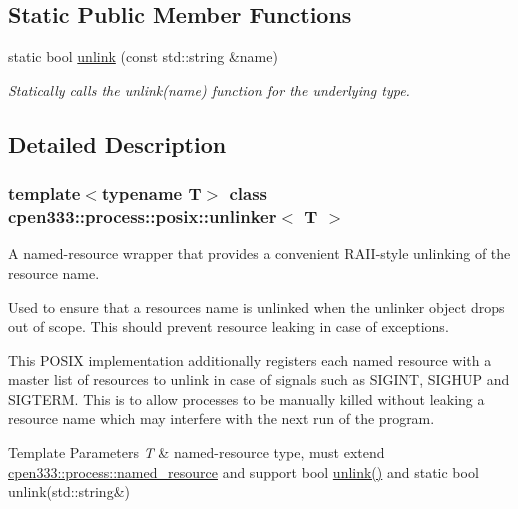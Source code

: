\subsection*{Static Public Member Functions}
\begin{DoxyCompactItemize}
\item 
static bool \hyperlink{classcpen333_1_1process_1_1posix_1_1unlinker_af105f80e5698e59b5c3994ff228ed6c9}{unlink} (const std\+::string \&name)
\begin{DoxyCompactList}\small\item\em Statically calls the {\ttfamily unlink(name)} function for the underlying type. \end{DoxyCompactList}\end{DoxyCompactItemize}


\subsection{Detailed Description}
\subsubsection*{template$<$typename T$>$\newline
class cpen333\+::process\+::posix\+::unlinker$<$ T $>$}

A named-\/resource wrapper that provides a convenient R\+A\+I\+I-\/style unlinking of the resource name. 

Used to ensure that a resource\textquotesingle{}s name is unlinked when the unlinker object drops out of scope. This should prevent resource leaking in case of exceptions.

This P\+O\+S\+IX implementation additionally registers each named resource with a master list of resources to unlink in case of signals such as S\+I\+G\+I\+NT, S\+I\+G\+H\+UP and S\+I\+G\+T\+E\+RM. This is to allow processes to be manually killed without leaking a resource name which may interfere with the next run of the program.


\begin{DoxyTemplParams}{Template Parameters}
{\em T} & named-\/resource type, must extend \hyperlink{classcpen333_1_1process_1_1named__resource}{cpen333\+::process\+::named\+\_\+resource} and support {\ttfamily bool \hyperlink{classcpen333_1_1process_1_1posix_1_1unlinker_af105f80e5698e59b5c3994ff228ed6c9}{unlink()}} and {\ttfamily static bool unlink(std\+::string\&)} \\
\hline
\end{DoxyTemplParams}


